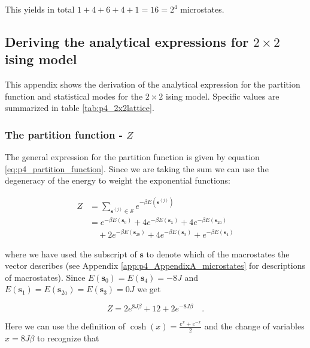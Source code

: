 \documentclass[../main_proj4_correct_template.tex]{subfiles}
\begin{document}
This yields in total $1+4+6+4+1 = 16 =2^{4}$ microstates.


\subsection{Deriving the analytical expressions for $2 \times 2$ ising model}\label{app:p4_AppendixA_analyticalexpressions}

This appendix shows the derivation of the analytical expression for the partition function and statistical modes for the $2\times 2$ ising model. Specific values are summarized in table \ref{tab:p4_2x2lattice}. 

\subsubsection{The partition function - $Z$}\label{app:p4a_partition_function}

The general expression for the partition function is given by equation \eqref{eq:p4_partition_function}. Since we are taking the sum we can use the degeneracy of the energy to weight the exponential functions:

\begin{equation*}
\begin{split}
Z & = \sum\limits_{\mathbf{s}^{(j)} \in \mathcal{S}} e ^{ - \beta E(\mathbf{s}^{(j)})} \\
&= e ^{ - \beta E(\mathbf{s}_0)} + 4e ^{ - \beta E(\mathbf{s_1})} + 4e ^{ - \beta E(\mathbf{s}_{2a})} \\
&\quad +2 e ^{ - \beta E(\mathbf{s}_{2b})} + 4e ^{ - \beta E(\mathbf{s}_3) } + e ^{ - \beta E(\mathbf{s}_4)} 
\end{split}
\end{equation*}

\noindent where we have used the subscript of $\mathbf{s}$ to denote which of the macrostates the vector describes (see Appendix \ref{app:p4_AppendixA_microstates} for descriptions of macrostates). Since $E(\mathbf{s}_0) = E(\mathbf{s}_4) = -8 J$ and $E(\mathbf{s}_1) = E(\mathbf{s}_{2a}) = E(\mathbf{s}_{3}) = 0 J$ we get

\begin{equation*}
Z = 2e^{8 J\beta } + 12 + 2e^{-8 J\beta } \quad.
\end{equation*}

\noindent Here we can use the definition of $\cosh(x) = \frac{e^x+e^{-x}}{2}$ and the change of variables $x=8J\beta$ to recognize that 
\end{document}
